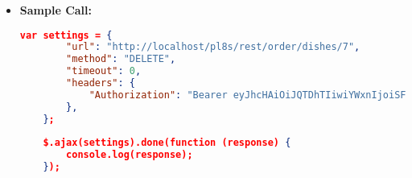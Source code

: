 \begin{itemize}
    \item \textbf{Sample Call:}
		\begin{lstlisting}[language=json]		
	var settings = {
		"url": "http://localhost/pl8s/rest/order/dishes/7",
		"method": "DELETE",
		"timeout": 0,
		"headers": {
			"Authorization": "Bearer eyJhcHAiOiJQTDhTIiwiYWxnIjoiSFM1MTIifQ.eyJ1aWQiOjMsInJvbCI6ImN1c3Rvb WVyIiwic3RyIjoiY3VzX1B3OHJKbmd5eldOcmZ5IiwiZGF0IjoxNzE0MzQyNjAxNjMwf Q.RrH8ojpudntUVEZVnbvVw1GpUEU56tdnhnCSrnCqoHgUAwMMxXJDcTMfKazQmrIZ_O Sfges7-lECny6p-t5ITA"
		},
	};
	
	$.ajax(settings).done(function (response) {
		console.log(response);
	});
	\end{lstlisting}
  \end{itemize}		
